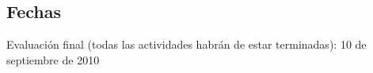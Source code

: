 \documentclass[a4paper,12pt]{article}
\begin{document}
\subsection{Fechas}

Evaluación final (todas las actividades habrán de estar terminadas): 10 de septiembre de 2010

\end{document}
